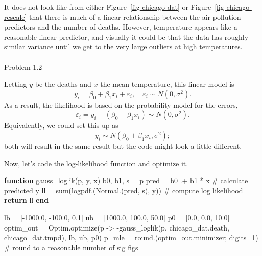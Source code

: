 \documentclass[
  letterpaper,
  DIV=11,
  numbers=noendperiod]{scrartcl}
\makeatletter
\let\oldparagraph\paragraph
\renewcommand{\paragraph}{
    \@ifstar
      \xxxParagraphStar
      \xxxParagraphNoStar
  }
\newcommand{\xxxParagraphStar}[1]{\oldparagraph*{#1}\mbox{}}
\newcommand{\xxxParagraphNoStar}[1]{\oldparagraph{#1}\mbox{}}
\newenvironment{Shaded}{\begin{snugshade}}{\end{snugshade}}
\newcommand{\CommentTok}[1]{\textcolor[rgb]{0.37,0.37,0.37}{#1}}
\newcommand{\ControlFlowTok}[1]{\textcolor[rgb]{0.00,0.23,0.31}{\textbf{#1}}}
\newcommand{\FloatTok}[1]{\textcolor[rgb]{0.68,0.00,0.00}{#1}}
\newcommand{\FunctionTok}[1]{\textcolor[rgb]{0.28,0.35,0.67}{#1}}
\newcommand{\KeywordTok}[1]{\textcolor[rgb]{0.00,0.23,0.31}{\textbf{#1}}}
\newcommand{\NormalTok}[1]{\textcolor[rgb]{0.00,0.23,0.31}{#1}}
\newcommand{\OperatorTok}[1]{\textcolor[rgb]{0.37,0.37,0.37}{#1}}
\newcommand*\circled[1]{\tikz[baseline=(char.base)]{
          \node[shape=circle,draw,inner sep=1pt] (char) {{\scriptsize#1}};}}
\makeatother
\begin{document}
It does not look like from either Figure~\ref{fig-chicago-dat} or
Figure~\ref{fig-chicago-rescale} that there is much of a linear
relationship between the air pollution predictors and the number of
deaths. However, temperature appears like a reasonable linear predictor,
and visually it could be that the data has roughly similar variance
until we get to the very large outliers at high temperatures.

\paragraph{Problem 1.2}\label{problem-1.2}

Letting \(y\) be the deaths and \(x\) the mean temperature, this linear
model is
\[y_i = \beta_0 + \beta_1 x_i + \varepsilon_i, \quad \varepsilon_i \sim N(0, \sigma^2).\]
As a result, the likelihood is based on the probability model for the
errors,
\[\varepsilon_i = y_i - \left(\beta_0 - \beta_1 x_i\right) \sim N(0, \sigma^2).\]
Equivalently, we could set this up as
\[y_i \sim N(\beta_0 + \beta_1 x_i, \sigma^2);\] both will result in the
same result but the code might look a little different.

Now, let's code the log-likelihood function and optimize it.

\label{annotated-cell-6}%
\begin{Shaded}
\begin{Highlighting}[]
\KeywordTok{function} \FunctionTok{gauss\_loglik}\NormalTok{(p, y, x) }\hspace*{\fill}\NormalTok{\circled{1}}
\NormalTok{    b0, b1, s }\OperatorTok{=}\NormalTok{ p }
\NormalTok{    pred }\OperatorTok{=}\NormalTok{ b0 }\OperatorTok{.+}\NormalTok{ b1 }\OperatorTok{*}\NormalTok{ x }\CommentTok{\# calculate predicted y}
\NormalTok{    ll }\OperatorTok{=} \FunctionTok{sum}\NormalTok{(}\FunctionTok{logpdf}\NormalTok{.(}\FunctionTok{Normal}\NormalTok{.(pred, s), y)) }\CommentTok{\# compute log likelihood}
    \ControlFlowTok{return}\NormalTok{ ll}
\KeywordTok{end}

\NormalTok{lb }\OperatorTok{=}\NormalTok{ [}\OperatorTok{{-}}\FloatTok{1000.0}\NormalTok{, }\OperatorTok{{-}}\FloatTok{100.0}\NormalTok{, }\FloatTok{0.1}\NormalTok{] }\hspace*{\fill}\NormalTok{\circled{2}}
\NormalTok{ub }\OperatorTok{=}\NormalTok{ [}\FloatTok{1000.0}\NormalTok{, }\FloatTok{100.0}\NormalTok{, }\FloatTok{50.0}\NormalTok{]}
\NormalTok{p0 }\OperatorTok{=}\NormalTok{ [}\FloatTok{0.0}\NormalTok{, }\FloatTok{0.0}\NormalTok{, }\FloatTok{10.0}\NormalTok{]}
\NormalTok{optim\_out }\OperatorTok{=}\NormalTok{ Optim.}\FunctionTok{optimize}\NormalTok{(p }\OperatorTok{{-}\textgreater{}} \FunctionTok{{-}gauss\_loglik}\NormalTok{(p, chicago\_dat.death, chicago\_dat.tmpd), lb, ub, p0)}
\NormalTok{p\_mle }\OperatorTok{=} \FunctionTok{round}\NormalTok{.(optim\_out.minimizer; digits}\OperatorTok{=}\FloatTok{1}\NormalTok{) }\CommentTok{\# round to a reasonable number of sig figs}
\end{Highlighting}
\end{Shaded}
\end{document}
